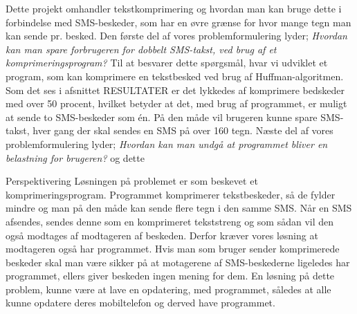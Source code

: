 Dette projekt omhandler tekstkomprimering og hvordan man kan bruge dette i forbindelse med SMS-beskeder, som har en øvre grænse for hvor mange tegn man kan sende pr. besked. Den første del af vores problemformulering lyder;
\emph{Hvordan kan man spare forbrugeren for dobbelt SMS-takst, ved brug af et komprimeringsprogram?}
Til at besvarer dette spørgsmål, hvar vi udviklet et program, som kan komprimere en tekstbesked ved brug af Huffman-algoritmen. Som det ses i afsnittet RESULTATER er det lykkedes af komprimere bedskeder med over 50 procent, hvilket betyder at det, med brug af programmet, er muligt at sende to SMS-beskeder som én. På den måde vil brugeren kunne spare SMS-takst, hver gang der skal sendes en SMS på over 160 tegn. 
Næste del af vores problemformulering lyder;
\emph{Hvordan kan man undgå at programmet bliver en belastning for brugeren?} og dette 

Perspektivering
Løsningen på problemet er som beskevet et komprimeringsprogram. Programmet komprimerer tekstbeskeder, så de fylder mindre og man på den måde kan sende flere tegn i den samme SMS. Når en SMS afsendes, sendes denne som en komprimeret tekststreng og som sådan vil den også modtages af modtageren af beskeden. Derfor kræver vores løsning at modtageren også har programmet. Hvis man som bruger sender komprimerede beskeder skal man være sikker på at motagerene af SMS-beskederne ligeledes har programmet, ellers giver beskeden ingen mening for dem. En løsning på dette problem, kunne være at lave en opdatering, med programmet, således at alle kunne opdatere deres mobiltelefon og derved have programmet. 